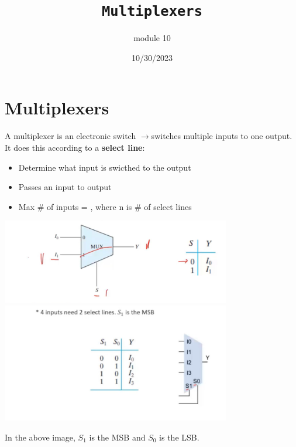 \documentclass[a4paper,12pt]{article}
\title{\texttt{Multiplexers}\\\hrulefill}
\author{module 10}
\date{\small{10/30/2023}}
\newcommand{\ra}{$\rightarrow$}
\begin{document}
    \maketitle

    \section{Multiplexers}
        A multiplexer is an electronic switch \ra switches multiple inputs to one output. It does this according to a \textbf{select line}:
        \begin{itemize}
            \item Determine what input is swicthed to the output
            \item Passes an input to output
            \item Max \# of inputs = , where n is \# of select lines
        \end{itemize}
        \includegraphics[width=10cm]{MultiplexerEx1.jpeg} \\
        \includegraphics*[width=10cm]{2nmultselct.jpeg}
        
        In the above image, $S_1$ is the MSB and $S_0$ is the LSB.
\end{document}
